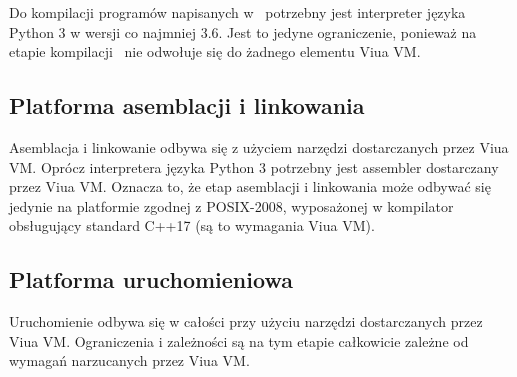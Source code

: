 Do kompilacji programów napisanych w \ViuAct\ potrzebny jest interpreter języka Python 3 w wersji co najmniej
3.6. Jest to jedyne ograniczenie, ponieważ na etapie kompilacji \ViuAct\ nie odwołuje się do żadnego elementu
Viua VM.

\subsection{Platforma asemblacji i linkowania}

Asemblacja i linkowanie odbywa się z użyciem narzędzi dostarczanych przez Viua VM.
Oprócz interpretera języka Python 3 potrzebny jest assembler dostarczany przez Viua VM. Oznacza to, że etap
asemblacji i linkowania może odbywać się jedynie na platformie zgodnej z POSIX-2008, wyposażonej w kompilator
obsługujący standard C++17 (są to wymagania Viua VM).

\subsection{Platforma uruchomieniowa}

Uruchomienie odbywa się w całości przy użyciu narzędzi dostarczanych przez Viua VM.
Ograniczenia i zależności są na tym etapie całkowicie zależne od wymagań narzucanych przez Viua VM.
